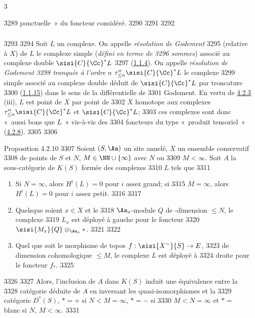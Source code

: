 3	\documentclass[10pt]{../fichiers-configuration-latex/smfart}
\begin{document}
  3289	ponctuelle »  du foncteur considéré.
  3290	
  3291	\setcounter{subsubsection}{8}
  3292	\subsubsection{}
  3293	
  3294	Soit $L$ un complexe. On appelle \emph{résolution de Godement}
  3295	(relative à $X$) de $L$ le complexe simple (\emph{défini en terme de
  3296	sommes}) associé au complexe double $\sisi{C}{\Cc}^{\ast}L$
  3297	(\hyperref[XVII.subsubsec1.1.4]{1.1.4}). On appelle \emph{résolution de Godement
  3298	tronquée à l'ordre} $n$ $\tau''_{\leq n}\sisi{C}{\Cc}^{\ast}L$ le complexe
  3299	simple associé au complexe double déduit de $\sisi{C}{\Cc}^{\ast}L$ par troncature
  3300	(\hyperref[XVII.subsubsec1.1.15]{1.1.15}) dans le sens de la différentielle de
  3301	Godement. En vertu de \hyperref[XVII.prop4.2.3]{4.2.3} (iii), $L$ est point de $X$ par point de
  3302	$X$ homotope aux complexes $\tau''_{\leq n} \sisi{C}{\Cc}^{\ast}L$ et $\sisi{C}{\Cc}^{\ast}L$;
  3303	ces complexes sont donc « aussi bons que $L$ » vis-à-vis des
  3304	foncteurs du type « produit tensoriel » (\hyperref[XVII.lem4.2.8]{4.2.8}).
  3305	
  3306	\begin{enonce*}{Proposition 4.2.10}
  3307	Soient $(S,\Aa)$ un site annelé, $X$ un ensemble conservatif
  3308	de points de $S$ et $N$, $M\in \NN\cup \{\infty\}$ avec $N$ ou
  3309	$M<\infty$. Soit $A$ la sous-catégorie de $K(S)$ formée des complexes
  3310	$L$ tels que
  3311	\begin{enumerate}
  3312	\renewcommand{\theenumi}{\alph{enumi}}
  3313	\renewcommand{\labelenumi}{(\theenumi)}
  3314	\item Si $N=\infty$, alors $H^{i}(L)=0$ pour $i$ assez grand; si
  3315	$M=\infty$, alors $H^{i}(L)=0$ pour $i$ assez petit.
  3316	
  3317	\item Quels\pageoriginale que soient $x\in X$ et le
  3318	$\Aa_x$-module $Q$ de \tTor-dimension $\leq N$, le complexe
  3319	$L_x$ est déployé à gauche pour le foncteur
  3320	$\sisi{M_x}{Q}\otimes_{\Aa_x}\ast$.
  3321	
  3322	\item Quel que soit le morphisme de topos $f:\sisi{X^{\sim}}{S}\rightarrow E$,
  3323	de dimension cohomologique $\leq M$, le complexe $L$ est déployé à
  3324	droite pour le foncteur $f_{\ast}$.
  3325	\end{enumerate}
  3326	
  3327	Alors, l'inclusion de $A$ dans $K(S)$ induit une équivalence entre la
  3328	catégorie déduite de $A$ en inversant les quasi-isomorphismes et la
  3329	catégorie $D^{\ast}(S)$, $\ast=+$ si $N<M=\infty$, $\ast=-$ si
  3330	$M<N=\infty$ et $\ast=$ blanc si $N$, $M<\infty$.
  3331	\end{enonce*}
\end{document}
